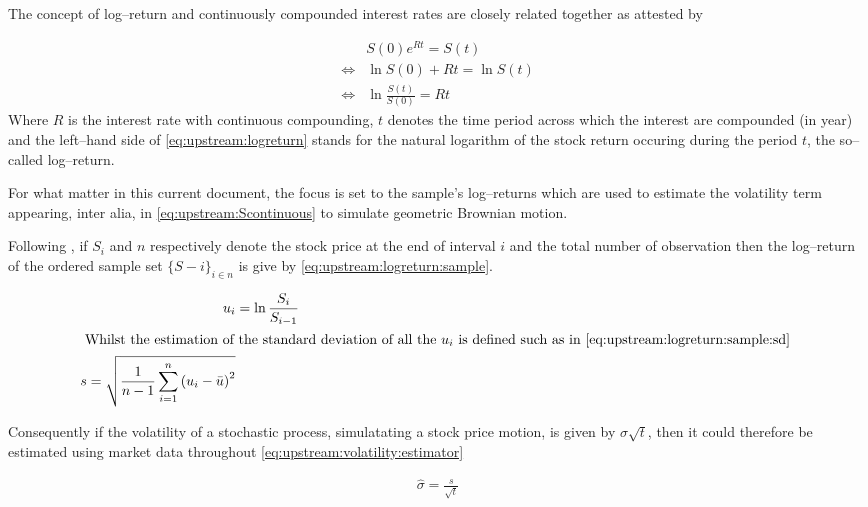 \documentclass[12pt]{report}
\newcommand{\St}{S\left(t\right)}
\begin{document}
The concept of log--return and continuously compounded interest rates are closely related together as attested by 

\begin{align}
&S(0) e^{Rt} = \St \label{eq:upstream:stock:valued} \\
\Longleftrightarrow  &\ln{S(0)} + Rt = \ln{\St} \\
\Longleftrightarrow  &\ln{\frac{\St}{S(0)}} = Rt \label{eq:upstream:logreturn}
\end{align}
Where $R$ is the interest rate with continuous compounding, $t$ denotes the time period across which the interest are compounded (in year) and the left--hand side of \cref{eq:upstream:logreturn} stands for the natural logarithm of the stock return occuring during the period $t$, the so--called log--return.

For what matter in this current document, the focus is set to the sample's log--returns which are used to estimate the volatility term appearing, inter alia, in \cref{eq:upstream:Scontinuous} to simulate geometric Brownian motion.

Following \citet{hull}, if $S_i$ and $n$ respectively denote the stock price at the end of interval $i$ and the total number of observation then the log--return of the ordered sample set $\{S-i\}_{i \in n}$ is give by \cref{eq:upstream:logreturn:sample}.

\begin{align}
  u_i &= \ln \frac{S_i}{S_{i-1}} \label{eq:upstream:logreturn:sample} \\
  \intertext{
  Whilst the estimation of the standard deviation of all the $u_i$ is defined such as in \cref{eq:upstream:logreturn:sample:sd}
  }
  s = \sqrt{\frac{1}{n - 1} \sum_{i = 1}^n \left(u_i - \bar{u} \right) ^2} \label{eq:upstream:logreturn:sd} \\
\end{align}

Consequently if the volatility of a stochastic process, simulatating a stock price motion, is given by $\sigma \sqrt{t}$, then it could therefore be estimated using market data throughout \cref{eq:upstream:volatility:estimator}

\begin{align}
  \hat{\sigma} = \frac{s}{\sqrt{t}} \label{eq:upstream:volatility:estimator}
\end{align}

\end{document}
